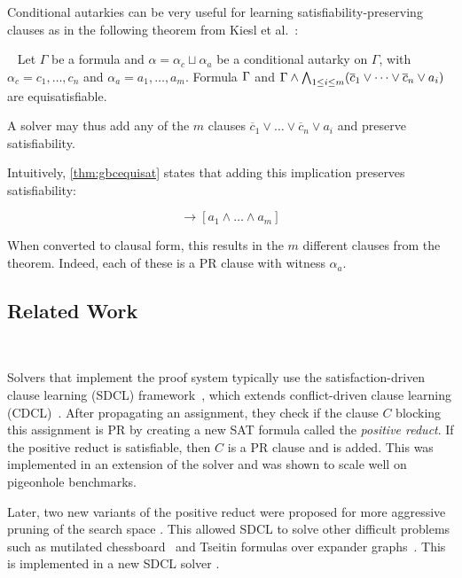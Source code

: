 Conditional autarkies can be very useful for learning satisfiability-preserving
clauses as in the following theorem from Kiesl et
al.~\cite{conditionalautarkies}:

\begin{theorem}~\label{thm:gbcequisat} Let $\Gamma$ be a formula and $\alpha =
    \alpha_c \sqcup \alpha_a$ be a conditional autarky on $\Gamma$, with
    $\alpha_c = c_1, \dots, c_n$ and $\alpha_a = a_1, \dots, a_m$. Formula
    $\Gamma$ and $\Gamma \land \bigwedge_{1 \leq i \leq m} (\overline{c}_1
    \lor \dots \lor \overline{c}_n \lor a_i)$ are equisatisfiable.
\end{theorem}

A solver may thus add any of the $m$ clauses $\overline{c}_1 \lor \dots \lor
\overline{c}_n \lor a_i$ and preserve satisfiability. 

Intuitively, \autoref{thm:gbcequisat} states that adding this implication
preserves satisfiability:

\begin{equation*}
    [c_1 \land \dots \land c_n] \rightarrow [a_1 \land \dots \land a_m]
\end{equation*}

When converted to clausal form, this results in the $m$ different clauses from
the theorem. Indeed, each of these is a PR clause with witness $\alpha_a$.


\subsection{Related Work}~\label{subsec:relatedwork}


Solvers that implement the \pr proof system typically use the
satisfaction-driven clause learning (SDCL) framework~\cite{sdcl}, which extends
conflict-driven clause learning (CDCL)~\cite{sat-handbook}. After propagating an
assignment, they check if the clause $C$ blocking this assignment is PR by
creating a new SAT formula called the \emph{positive reduct}. If the positive
reduct is satisfiable, then $C$ is a PR clause and is added. This was
implemented in an extension of the solver \lingeling and was shown to scale well
on pigeonhole benchmarks.

Later, two new variants of the positive reduct were proposed for more aggressive
pruning of the search space \cite{sadical}. This allowed SDCL to solve other
difficult problems such as mutilated chessboard~\cite{mutilatedchessboard-pr}
and Tseitin formulas over expander graphs~\cite{hardexamplesresolution}. This is
implemented in a new SDCL solver \sadical.


